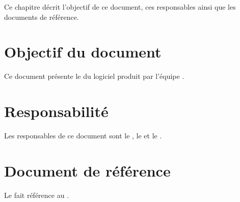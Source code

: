 	Ce chapitre décrit l'objectif de ce document, ces responsables ainsi que les documents de référence.

\section{Objectif du document}
	Ce document présente le \JTI{} du logiciel produit par l'équipe \nomEquipe{}.
	
\section{Responsabilité}
	Les responsables de ce document sont le \CP, le \RQ{} et le \RD.
	
\section{Document de référence}
	Le \JTI{} fait référence au \PTI.
